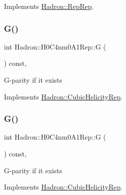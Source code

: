 Implements \mbox{\hyperlink{structHadron_1_1RepRep_a92c8802e5ed7afd7da43ccfd5b7cd92b}{Hadron\+::\+Rep\+Rep}}.

\mbox{\label{structHadron_1_1H0C4nm0A1Rep_a51f07119171a1010fe83724438b4e7bc}} 
\subsubsection{\texorpdfstring{G()}{G()}\hspace{0.1cm}{\footnotesize\ttfamily [1/3]}}
{\footnotesize\ttfamily int Hadron\+::\+H0\+C4nm0\+A1\+Rep\+::G (\begin{DoxyParamCaption}{ }\end{DoxyParamCaption}) const\hspace{0.3cm}{\ttfamily [inline]}, {\ttfamily [virtual]}}

G-\/parity if it exists 

Implements \mbox{\hyperlink{structHadron_1_1CubicHelicityRep_a50689f42be1e6170aa8cf6ad0597018b}{Hadron\+::\+Cubic\+Helicity\+Rep}}.

\mbox{\label{structHadron_1_1H0C4nm0A1Rep_a51f07119171a1010fe83724438b4e7bc}} 
\subsubsection{\texorpdfstring{G()}{G()}\hspace{0.1cm}{\footnotesize\ttfamily [2/3]}}
{\footnotesize\ttfamily int Hadron\+::\+H0\+C4nm0\+A1\+Rep\+::G (\begin{DoxyParamCaption}{ }\end{DoxyParamCaption}) const\hspace{0.3cm}{\ttfamily [inline]}, {\ttfamily [virtual]}}

G-\/parity if it exists 

Implements \mbox{\hyperlink{structHadron_1_1CubicHelicityRep_a50689f42be1e6170aa8cf6ad0597018b}{Hadron\+::\+Cubic\+Helicity\+Rep}}.

\mbox{\label{structHadron_1_1H0C4nm0A1Rep_a51f07119171a1010fe83724438b4e7bc}} 
